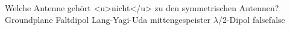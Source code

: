    {Welche Antenne gehört <u>nicht</u> zu den symmetrischen Antennen?}
    {Groundplane}
    {Faltdipol}
    {Lang-Yagi-Uda}
    {mittengespeister $\lambda$/2-Dipol}
    {false}{false}